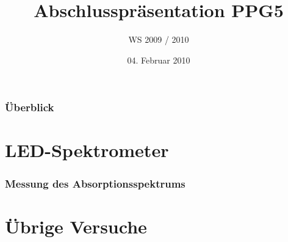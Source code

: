 \documentclass[10pt]{beamer}
\title{Abschlusspr\"asentation PPG5}
\subtitle{WS 2009 / 2010}
\date{04. Februar 2010}
\begin{document}
\frame
{
\titlepage
}

\frame
{
\frametitle{\"Uberblick}
\tableofcontents
}
\section{LED-Spektrometer}
\frame
{
\frametitle{Messung des Absorptionsspektrums}
}

\frame
{
\frametitle{}
}
\section{\"Ubrige Versuche}
\frame
{
}
\end{document}
